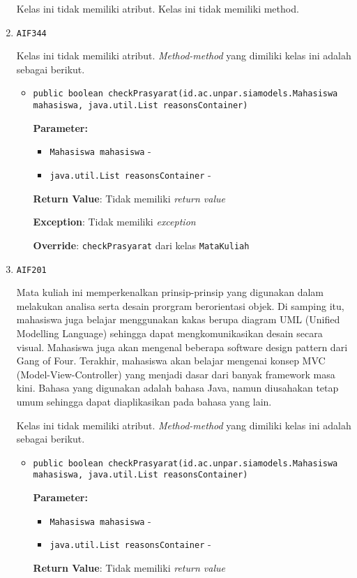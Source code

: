 \documentclass{article}
\begin{document}
\begin{enumerate}
Kelas ini tidak memiliki atribut. Kelas ini tidak memiliki method. \item \texttt{AIF344}



Kelas ini tidak memiliki atribut. \textit{Method-method} yang dimiliki kelas ini adalah sebagai berikut.
\begin{itemize}
\item \texttt{public boolean checkPrasyarat(id.ac.unpar.siamodels.Mahasiswa mahasiswa, java.util.List reasonsContainer)}

\textbf{Parameter:}
\begin{itemize}
\item \texttt{Mahasiswa mahasiswa} - 
\item \texttt{java.util.List reasonsContainer} - 
\end{itemize}
\textbf{Return Value}: Tidak memiliki \textit{return value}

\textbf{Exception}: Tidak memiliki \textit{exception}

\textbf{Override}: \texttt{checkPrasyarat} dari kelas \texttt{MataKuliah}

\end{itemize}
\item \texttt{AIF201}

Mata kuliah ini memperkenalkan prinsip-prinsip yang digunakan dalam 
 melakukan analisa serta desain prorgram berorientasi objek. Di samping itu, 
 mahasiswa juga belajar menggunakan kakas berupa diagram UML (Unified 
 Modelling Language) sehingga dapat mengkomunikasikan desain secara visual. 
 Mahasiswa juga akan mengenal beberapa software design pattern dari Gang of 
 Four. Terakhir, mahasiswa akan belajar mengenai konsep MVC 
 (Model-View-Controller) yang menjadi dasar dari banyak framework masa kini.
 Bahasa yang digunakan adalah bahasa Java, namun diusahakan tetap umum 
 sehingga dapat diaplikasikan pada bahasa yang lain.

Kelas ini tidak memiliki atribut. \textit{Method-method} yang dimiliki kelas ini adalah sebagai berikut.
\begin{itemize}
\item \texttt{public boolean checkPrasyarat(id.ac.unpar.siamodels.Mahasiswa mahasiswa, java.util.List reasonsContainer)}

\textbf{Parameter:}
\begin{itemize}
\item \texttt{Mahasiswa mahasiswa} - 
\item \texttt{java.util.List reasonsContainer} - 
\end{itemize}
\textbf{Return Value}: Tidak memiliki \textit{return value}


\end{itemize}
\end{enumerate}
\end{document}
